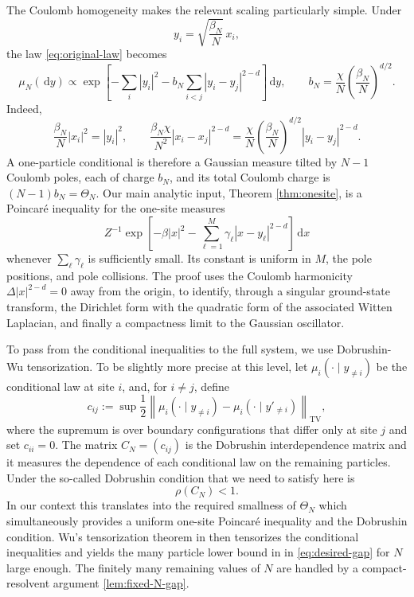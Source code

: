 \documentclass[12pt,reqno,letterpaper]{amsart}
\theoremstyle{definition}
\theoremstyle{remark}
\numberwithin{equation}{section}
\newcommand{\dd}{\,\mathrm d}
\newcommand{\be}{\beta}
\begin{document}
The Coulomb homogeneity makes the relevant scaling particularly simple.  Under
\[
 y_i=\sqrt{\frac{\be_N}{N}}\,x_i,
\]
the law \eqref{eq:original-law} becomes
\begin{equation}\label{eq:scaled-law}
 \mu_N(\dd y)
 \propto
 \exp\!\left[-\sum_i|y_i|^2
 -b_N\sum_{i<j}|y_i-y_j|^{2-d}\right]\dd y,
 \qquad
 b_N=\frac{\chi}{N}\left(\frac{\be_N}{N}\right)^{d/2}.
\end{equation}
Indeed,
\[
 \frac{\be_N}{N}|x_i|^2=|y_i|^2,
 \qquad
 \frac{\be_N\chi}{N^2}|x_i-x_j|^{2-d}
 =\frac{\chi}{N}\left(\frac{\be_N}{N}\right)^{d/2}
 |y_i-y_j|^{2-d}.
\]
A one-particle conditional is therefore a Gaussian measure tilted by
\(N-1\) Coulomb poles, each of charge \(b_N\), and its total Coulomb charge
is
\((N-1)b_N=\Theta_N.\)
Our main analytic input, Theorem \ref{thm:onesite}, is a Poincar\'e
inequality for the one-site measures
\[ Z^{-1}\exp\!\left[
 -\be|x|^2 -\sum_{\ell=1}^M\gamma_\ell|x-y_\ell|^{2-d} \right]\dd x
\]
whenever \(\sum_\ell\gamma_\ell\) is sufficiently small. Its constant is uniform in \(M\), the pole positions, and pole collisions. 
 The proof uses the Coulomb harmonicity
\(\Delta|x|^{2-d}=0\) away from the origin, to identify, through a singular ground-state
transform, the Dirichlet form with the quadratic form of the associated Witten Laplacian, and finally a compactness limit to the Gaussian oscillator.

To pass from the conditional inequalities to the full system, we use
Dobrushin-Wu tensorization. To be slightly more precise at this level, let
\(\mu_i(\cdot\mid y_{\ne i})\) be the conditional law at site \(i\), and,
for \(i\ne j\), define
\[
 c_{ij} :=
 \sup\frac12
 \left\|
 \mu_i(\cdot\mid y_{\ne i}) -
 \mu_i(\cdot\mid y'_{\ne i})
 \right\|_{\mathrm{TV}},
\]
where the supremum is over boundary configurations that differ only at
site \(j\) and set \(c_{ii}=0\). The matrix \(C_N=(c_{ij})\) is the Dobrushin interdependence matrix and it measures the
dependence of each conditional law on the remaining particles. Under the so-called Dobrushin condition that we need to satisfy here is
\[
 \rho(C_N)<1.
\]
In our context this translates into the required smallness of \(\Theta_N\) which simultaneously provides a uniform
one-site Poincar\'e inequality and the Dobrushin condition. Wu's tensorization theorem in \cite{Wu} then tensorizes the conditional inequalities and yields the
many particle lower bound in in \eqref{eq:desired-gap} for $N$ large enough. 
The finitely many remaining values of \(N\) are handled by a compact-resolvent argument \ref{lem:fixed-N-gap}. 
\end{document}
